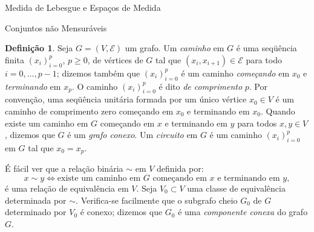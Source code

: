 \documentclass[oneside,final,11pt]{amsbook}
\theoremstyle{remark}\newtheorem{exercise}{Exercício}[chapter]
\theoremstyle{remark}\newtheorem{*exercise}[exercise]{\hbox to 0pt{\hskip 0pt minus 1fil*}Exercício}
\theoremstyle{definition}\newtheorem{exdefin}{Definição}[chapter]
\theoremstyle{plain}\newtheorem{teo}{Teorema}[section]
\theoremstyle{plain}\newtheorem{lem}[teo]{Lema}
\theoremstyle{plain}\newtheorem{prop}[teo]{Proposição}
\theoremstyle{plain}\newtheorem{cor}[teo]{Corolário}
\theoremstyle{definition}\newtheorem{defin}[teo]{Definição}
\theoremstyle{remark}\newtheorem{rem}[teo]{Observação}
\theoremstyle{definition}\newtheorem{notation}[teo]{Notação}
\theoremstyle{definition}\newtheorem{convention}[teo]{Convenção}
\theoremstyle{definition}\newtheorem{example}[teo]{Exemplo}
\numberwithin{section}{chapter}
\numberwithin{equation}{section}
\begin{document}
\begin{chapter}{Medida de Lebesgue e Espaços de Medida}
\begin{section}{Conjuntos não Mensuráveis}
\begin{defin}
Seja $G=(V,\mathcal E)$ um grafo. Um {\em caminho\/} em $G$ é uma seqüência finita $(x_i)_{i=0}^p$, $p\ge0$,
de vértices de $G$ tal que $(x_i,x_{i+1})\in\mathcal E$ para todo $i=0,\ldots,p-1$; dizemos também
que $(x_i)_{i=0}^p$ é um caminho {\em começando\/} em $x_0$ e {\em terminando\/} em $x_p$.
O caminho $(x_i)_{i=0}^p$ é dito {\em de comprimento\/} $p$.
Por convenção, uma seqüência unitária formada por um único vértice $x_0\in V$ é um caminho de
comprimento zero começando em $x_0$ e terminando em $x_0$. Quando existe um caminho em $G$ começando
em $x$ e terminando em $y$ para todos $x,y\in V$, dizemos que $G$ é um {\em grafo conexo}.
Um {\em circuito\/} em $G$ é um caminho $(x_i)_{i=0}^p$ em $G$ tal que $x_0=x_p$.
\end{defin}
É fácil ver que a relação binária $\sim$ em $V$ definida por:
\[x\sim y\Longleftrightarrow\text{existe um caminho em $G$ começando em $x$ e terminando em $y$},\]
é uma relação de equivalência em $V$. Seja $V_0\subset V$ uma classe de equivalência determinada
por $\sim$. Verifica-se facilmente que o subgrafo cheio $G_0$ de $G$ determinado por $V_0$ é conexo;
dizemos que $G_0$ é uma {\em componente conexa\/} do
grafo $G$.


\end{section}
\end{chapter}
\end{document}
